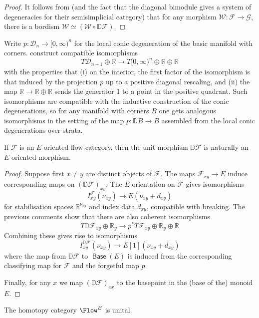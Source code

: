 \documentclass{TPmod}
\def\bD{\mathbb{D}}
\def\bR{\mathbb{R}}
\DeclareMathOperator{\Base}{\mathsf{Base}}
\newcommand{\cD}{\mathcal{D}}
\newcommand{\cF}{\mathcal{F}}
\newcommand{\cG}{\mathcal{G}}
\newcommand{\cW}{\mathcal{W}}
\numberwithin{equation}{section}
\begin{document}
\begin{proof}
    It follows from \cite[Lemma 6.10]{AB2} (and the fact that the diagonal bimodule gives a system of degeneracies for their semisimplicial category) that for any morphism $\cW: \cF \to \cG$, there is a bordism $\cW \simeq (\cW \circ \bD \cF)$. 
\end{proof}

Write $p: \cD_n \to [0,\infty)^n$ for the local conic degeneration of the basic manifold with corners.  \cite[Lemma 6.11]{AB2} construct compatible isomorphisms
\[
T\cD_{n+1} \oplus \underline{\bR} \to T[0,\infty)^n \oplus \underline{\bR} \oplus \bR
\]
with the properties  that (i) on the interior, the first factor of the isomorphism is that induced by the projection $p$ up to a positive diagonal rescaling, and (ii) the map $\underline{\bR} \to \underline{\bR} \oplus \bR$ sends the generator $1$ to a point in the positive quadrant. Such isomorphisms are compatible with the inductive construction of the conic degenerations, so for any manifold with corners $B$ one gets analogous isomorphisms in the setting of the map  $p: \bD B \to B$ assembled from the local conic degenerations over strata.

\begin{lem}\label{lem:unit morphism is oriented}
    If $\cF$ is an $E$-oriented flow category, then the unit morphism $\bD \cF$ is naturally an $E$-oriented morphism.
\end{lem}

    \begin{proof}
    Suppose first $x\neq y$ are distinct objects of $\cF$.  The maps $\cF_{xy} \to E$ induce corresponding maps on $(\bD\cF)_{xy}$. 
The $E$-orientation on $\cF$ gives isomorphisms
\[
I_{xy}^{\cF}(\nu_{xy}) \to E(\nu_{xy} + d_{xy})
\]
for stabilisation spaces $\bR^{\nu_{xy}}$ and index data $d_{xy}$, 
compatible with breaking. The previous comments show that there are also coherent isomorphisms
\[
T \bD\cF_{xy} \oplus \bR_y \to p^*T\cF_{xy} \oplus \bR_y \oplus \bR
\]
  Combining these gives rise to isomorphisms
  \[
  I_{xy}^{\bD\cF}(\nu_{xy}) \to E[1](\nu_{xy} + d_{xy})
  \]
where the map from $\bD\cF$ to $\Base(E)$ is induced from the corresponding classifying map for $\cF$ and the forgetful map $p$.  
  
     Finally, for any $x$ we map $(\bD\cF)_{xx}$ to the basepoint in the (base of the) monoid $E$.      
     \end{proof}

\begin{lem}
    The homotopy category $\Flow^{E}$ is unital.
\end{lem}
\end{document}
